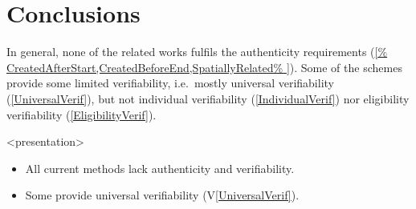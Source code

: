 \mode*
\section{Conclusions}

In general, none of the related works fulfils the authenticity requirements 
(\cref{%
  CreatedAfterStart,CreatedBeforeEnd,SpatiallyRelated%
}).
Some of the schemes provide some limited verifiability, i.e.\ mostly universal 
verifiability (\cref{UniversalVerif}), but not individual verifiability 
(\cref{IndividualVerif}) nor eligibility verifiability 
(\cref{EligibilityVerif}).

\begin{frame}<presentation>
  \begin{remark}
    \begin{itemize}
      \item All current methods lack authenticity and verifiability.
      \item Some provide universal verifiability (V\ref{UniversalVerif}).
    \end{itemize}
  \end{remark}
\end{frame}
